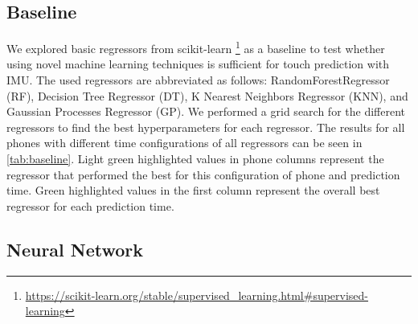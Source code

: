 \subsection{Baseline}
We explored basic regressors from scikit-learn \footnote{\url{https://scikit-learn.org/stable/supervised\_learning.html\#supervised-learning}} as a baseline to test whether using novel machine learning techniques is sufficient for touch prediction with IMU.
The used regressors are abbreviated as follows: RandomForestRegressor (RF), Decision Tree Regressor (DT), K Nearest Neighbors Regressor (KNN), and Gaussian Processes Regressor (GP).
We performed a grid search for the different regressors to find the best hyperparameters for each regressor.
The results for all phones with different time configurations of all regressors can be seen in \cref{tab:baseline}.
Light green highlighted values in phone columns represent the regressor that performed the best for this configuration of phone and prediction time.
Green highlighted values in the first column represent the overall best regressor for each prediction time.

\subsection{Neural Network}

